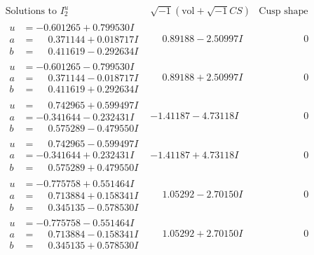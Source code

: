 \documentclass[1p]{elsarticle_modified}
\theoremstyle{definition}
\newcommand{\I}{\sqrt{-1}}
\begin{document}
$$\begin{array}{c|c|c}  
\text{Solutions to }I^u_{2}& \I (\text{vol} + \sqrt{-1}CS) & \text{Cusp shape}\\
 \hline 
\begin{aligned}
u &= -0.601265 + 0.799530 I \\
a &= \phantom{-}0.371144 + 0.018717 I \\
b &= \phantom{-}0.411619 - 0.292634 I\end{aligned}
 & \phantom{-}0.89188 - 2.50997 I & \phantom{-0.000000 } 0 \\ \hline\begin{aligned}
u &= -0.601265 - 0.799530 I \\
a &= \phantom{-}0.371144 - 0.018717 I \\
b &= \phantom{-}0.411619 + 0.292634 I\end{aligned}
 & \phantom{-}0.89188 + 2.50997 I & \phantom{-0.000000 } 0 \\ \hline\begin{aligned}
u &= \phantom{-}0.742965 + 0.599497 I \\
a &= -0.341644 - 0.232431 I \\
b &= \phantom{-}0.575289 - 0.479550 I\end{aligned}
 & -1.41187 - 4.73118 I & \phantom{-0.000000 } 0 \\ \hline\begin{aligned}
u &= \phantom{-}0.742965 - 0.599497 I \\
a &= -0.341644 + 0.232431 I \\
b &= \phantom{-}0.575289 + 0.479550 I\end{aligned}
 & -1.41187 + 4.73118 I & \phantom{-0.000000 } 0 \\ \hline\begin{aligned}
u &= -0.775758 + 0.551464 I \\
a &= \phantom{-}0.713884 + 0.158341 I \\
b &= \phantom{-}0.345135 - 0.578530 I\end{aligned}
 & \phantom{-}1.05292 - 2.70150 I & \phantom{-0.000000 } 0 \\ \hline\begin{aligned}
u &= -0.775758 - 0.551464 I \\
a &= \phantom{-}0.713884 - 0.158341 I \\
b &= \phantom{-}0.345135 + 0.578530 I\end{aligned}
 & \phantom{-}1.05292 + 2.70150 I & \phantom{-0.000000 } 0 \\ \hline\begin{aligned}

\end{aligned}
\end{array}$$
\end{document}
